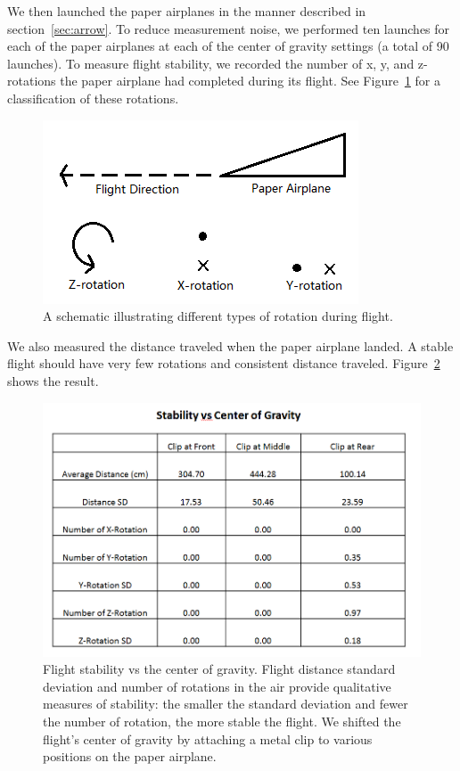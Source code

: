 We then launched the paper airplanes in the manner described in section~\ref{sec:arrow}. To reduce measurement noise, we performed ten launches for each of the paper airplanes at each of the center of gravity settings (a total of 90 launches). To measure flight stability, we recorded the number of x, y, and z-rotations the paper airplane had completed during its flight. See Figure~\ref{fig:rotation} for a classification of these rotations. 

\begin{figure}[hl]
	\centering
		\includegraphics[scale=1]{figures/rotation.png}
		\caption{A schematic illustrating different types of rotation during flight.}
	\label{fig:rotation}
\end{figure}

We also measured the distance traveled when the paper airplane landed. A stable flight should have very few rotations and consistent distance traveled. Figure~\ref{fig:centerofgravity} shows the result. 

\begin{figure}[hl]
	\centering
		\includegraphics[scale=0.5]{figures/centerofgravity.png}
		\caption{Flight stability vs the center of gravity. Flight distance standard deviation and number of rotations in the air provide qualitative measures of stability: the smaller the standard deviation and fewer the number of rotation, the more stable the flight. We shifted the flight's center of gravity by attaching a metal clip to various positions on the paper airplane.}
	\label{fig:centerofgravity}
\end{figure}

